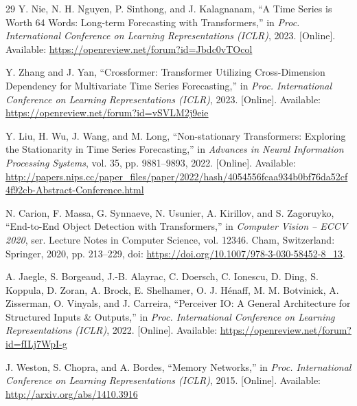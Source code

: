 \begin{thebibliography}{29}
Y. Nie, N. H. Nguyen, P. Sinthong, and J. Kalagnanam, ``A Time Series is Worth 64 Words: Long-term Forecasting with Transformers,'' in \textit{Proc. International Conference on Learning Representations (ICLR)}, 2023. [Online]. Available: \url{https://openreview.net/forum?id=Jbdc0vTOcol}

Y. Zhang and J. Yan, ``Crossformer: Transformer Utilizing Cross-Dimension Dependency for Multivariate Time Series Forecasting,'' in \textit{Proc. International Conference on Learning Representations (ICLR)}, 2023. [Online]. Available: \url{https://openreview.net/forum?id=vSVLM2j9eie}

Y. Liu, H. Wu, J. Wang, and M. Long, ``Non-stationary Transformers: Exploring the Stationarity in Time Series Forecasting,'' in \textit{Advances in Neural Information Processing Systems}, vol. 35, pp. 9881--9893, 2022. [Online]. Available: \url{http://papers.nips.cc/paper_files/paper/2022/hash/4054556fcaa934b0bf76da52cf4f92cb-Abstract-Conference.html}

N. Carion, F. Massa, G. Synnaeve, N. Usunier, A. Kirillov, and S. Zagoruyko, ``End-to-End Object Detection with Transformers,'' in \textit{Computer Vision -- ECCV 2020}, ser. Lecture Notes in Computer Science, vol. 12346. Cham, Switzerland: Springer, 2020, pp. 213--229, doi: \url{https://doi.org/10.1007/978-3-030-58452-8_13}.

A. Jaegle, S. Borgeaud, J.-B. Alayrac, C. Doersch, C. Ionescu, D. Ding, S. Koppula, D. Zoran, A. Brock, E. Shelhamer, O. J. H{\'{e}}naff, M. M. Botvinick, A. Zisserman, O. Vinyals, and J. Carreira, ``Perceiver IO: A General Architecture for Structured Inputs \& Outputs,'' in \textit{Proc. International Conference on Learning Representations (ICLR)}, 2022. [Online]. Available: \url{https://openreview.net/forum?id=fILj7WpI-g}

J. Weston, S. Chopra, and A. Bordes, ``Memory Networks,'' in \textit{Proc. International Conference on Learning Representations (ICLR)}, 2015. [Online]. Available: \url{http://arxiv.org/abs/1410.3916}

\end{thebibliography}
